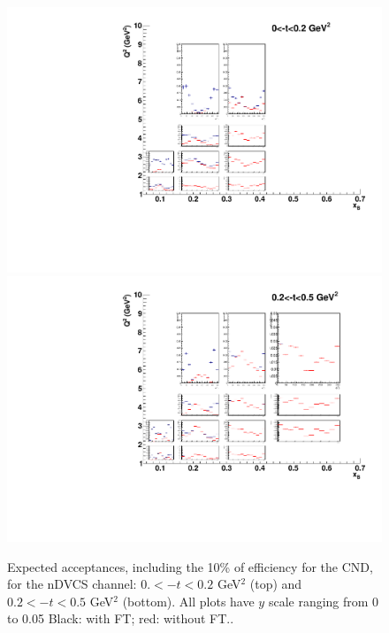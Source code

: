 \begin{figure}  
\begin{center}
\includegraphics[width=130mm]{plot_acc_1_FT_noFT_100days.pdf}
\includegraphics[width=130mm]{plot_acc_2_FT_noFT_100days.pdf}
\caption{Expected acceptances, including the 10\% of efficiency for the CND, for the nDVCS channel: $0.<-t<0.2$ GeV$^2$ (top) and $0.2<-t<0.5$ GeV$^2$ (bottom). All plots have $y$ scale ranging from 0 to 0.05 Black: with FT; red: without FT.. \label{acceptance_1}}
\end{center}
\end{figure}
